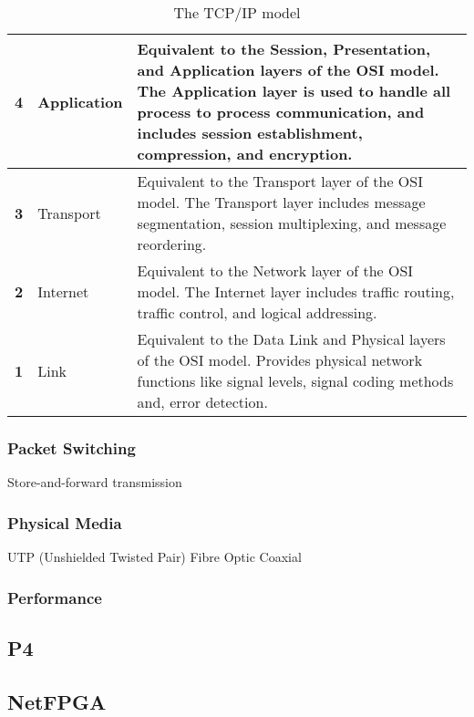 \documentclass[12pt, a4paper, twoside, onecolumn]{article}
\begin{document}
\begin{table}[!ht]
  \begin{center}
    \begin{tabularx}{\textwidth}{|c|l|X|}
      \hline
      \textbf{4} & Application & Equivalent to the Session, Presentation, and Application layers of the OSI model. The Application layer is used to handle all process to process communication, and includes session establishment, compression, and encryption. \\ \hline
      \textbf{3} & Transport & Equivalent to the Transport layer of the OSI model. The Transport layer includes message segmentation, session multiplexing, and message reordering. \\ \hline
      \textbf{2} & Internet & Equivalent to the Network layer of the OSI model. The Internet layer includes traffic routing, traffic control, and logical addressing. \\ \hline
      \textbf{1} & Link & Equivalent to the Data Link and Physical layers of the OSI model. Provides physical network functions like signal levels, signal coding methods and, error detection. \\ \hline
    \end{tabularx}
  \end{center}
  \caption{The TCP/IP model \cite{tcpip_pearson}}
  \label{tcp_ip_model}
\end{table}

\subsubsection{Packet Switching}
Store-and-forward transmission
\subsubsection{Physical Media}
UTP (Unshielded Twisted Pair)
Fibre Optic
Coaxial
\subsubsection{Performance}



\subsection{P4}
\subsection{NetFPGA}
\end{document}
